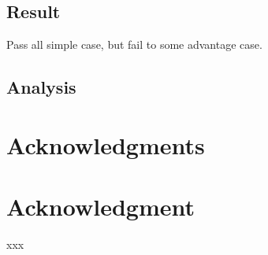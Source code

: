 \documentclass[conference,compsoc]{IEEEtran}
\begin{document}
\subsection{Result}
Pass all simple case, but fail to some advantage case.

\subsection{Analysis}



\ifCLASSOPTIONcompsoc
  \section*{Acknowledgments}
\else
  \section*{Acknowledgment}
\fi



%
%
\begin{thebibliography}{1}
 xxx
\end{thebibliography}





\end{document}
